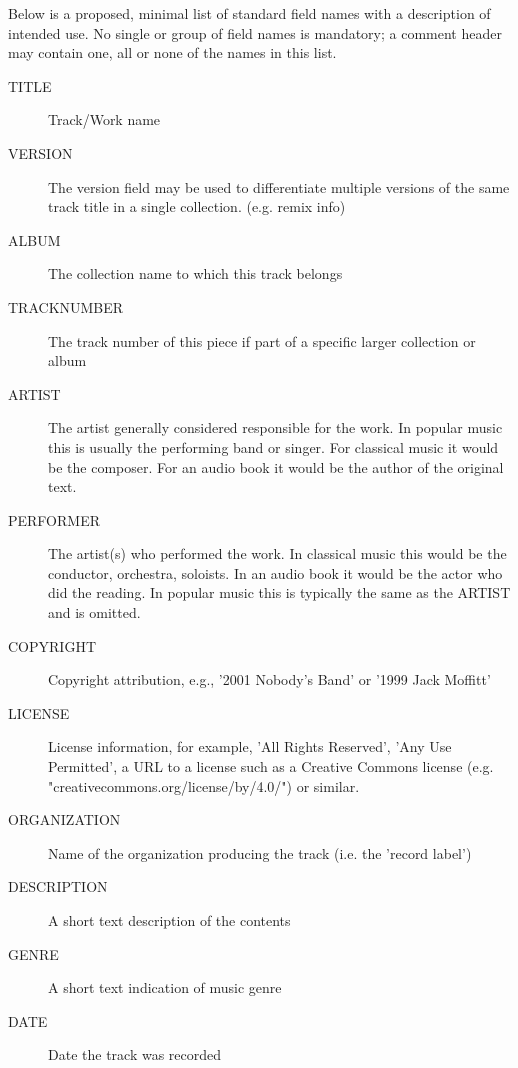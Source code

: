Below is a proposed, minimal list of standard field names with a
description of intended use.  No single or group of field names is
mandatory; a comment header may contain one, all or none of the names
in this list.

\begin{description} %
\item[TITLE]
	Track/Work name

\item[VERSION]
	The version field may be used to differentiate multiple
versions of the same track title in a single collection. (e.g. remix
info)

\item[ALBUM]
	The collection name to which this track belongs

\item[TRACKNUMBER]
	The track number of this piece if part of a specific larger collection or album

\item[ARTIST]
	The artist generally considered responsible for the work. In popular music this is usually the performing band or singer. For classical music it would be the composer. For an audio book it would be the author of the original text.

\item[PERFORMER]
	The artist(s) who performed the work. In classical music this would be the conductor, orchestra, soloists. In an audio book it would be the actor who did the reading. In popular music this is typically the same as the ARTIST and is omitted.

\item[COPYRIGHT]
	Copyright attribution, e.g., '2001 Nobody's Band' or '1999 Jack Moffitt'

\item[LICENSE]
	License information, for example, 'All Rights Reserved', 'Any
Use Permitted', a URL to a license such as a Creative Commons license
(e.g. "creativecommons.org/license/by/4.0/") or similar.

\item[ORGANIZATION]
	Name of the organization producing the track (i.e.
the 'record label')

\item[DESCRIPTION]
	A short text description of the contents

\item[GENRE]
	A short text indication of music genre

\item[DATE]
	Date the track was recorded


\end{description}
